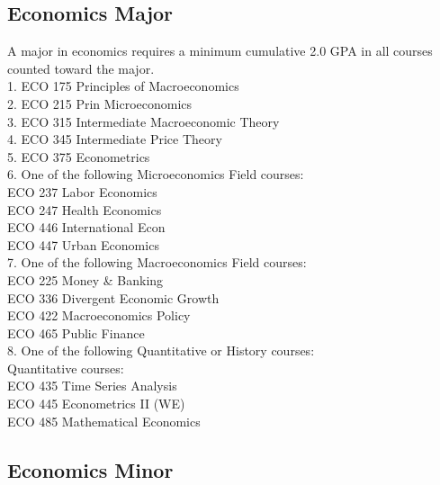 \documentclass[
  letterpaper,
]{scrbook}
\begin{document}
\subsection{Economics Major}\label{economics-major}

A major in economics requires a minimum cumulative 2.0 GPA in all
courses counted toward the major.\\
1. ECO 175 Principles of Macroeconomics\\
2. ECO 215 Prin Microeconomics\\
3. ECO 315 Intermediate Macroeconomic Theory\\
4. ECO 345 Intermediate Price Theory\\
5. ECO 375 Econometrics\\
6. One of the following Microeconomics Field courses:\\
ECO 237 Labor Economics\\
ECO 247 Health Economics\\
ECO 446 International Econ\\
ECO 447 Urban Economics\\
7. One of the following Macroeconomics Field courses:\\
ECO 225 Money \& Banking\\
ECO 336 Divergent Economic Growth\\
ECO 422 Macroeconomics Policy\\
ECO 465 Public Finance\\
8. One of the following Quantitative or History courses:\\
Quantitative courses:\\
ECO 435 Time Series Analysis\\
ECO 445 Econometrics II (WE)\\
ECO 485 Mathematical Economics

\subsection{Economics Minor}\label{economics-minor}
\end{document}
